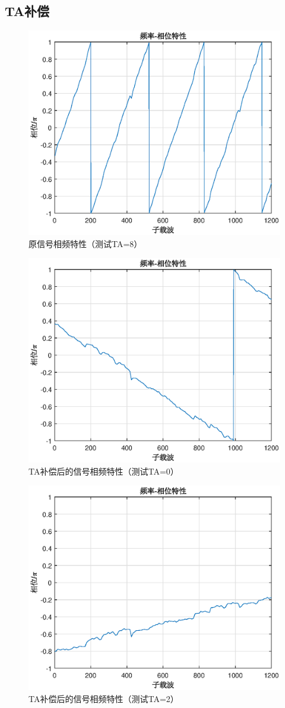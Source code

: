 \documentclass{article}
\begin{document}
\subsection{TA补偿}
\begin{figure}[H]
	\centering
	\includegraphics[width = .8\textwidth]{before.eps}
	\caption{原信号相频特性（测试TA=8）}
\end{figure}
\begin{figure}[H]
	\centering
	\includegraphics[width = .8\textwidth]{after.eps}
	\caption{TA补偿后的信号相频特性（测试TA=0）}
\end{figure}
\begin{figure}[H]
	\centering
	\includegraphics[width = .8\textwidth]{fp6.eps}
	\caption{TA补偿后的信号相频特性（测试TA=2）}
\end{figure}
\end{document}
